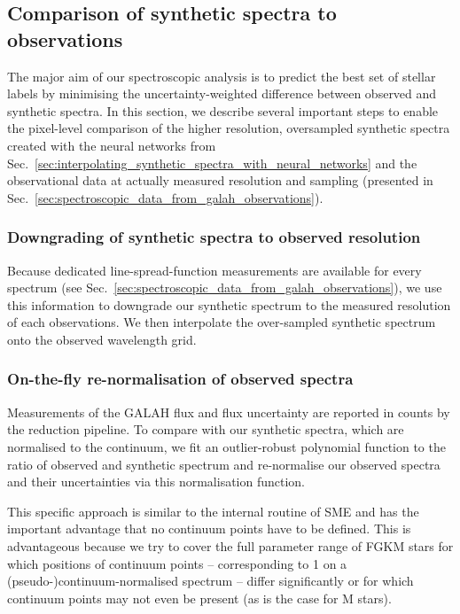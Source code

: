 \documentclass[
  journal=pasa,
  manuscript=research-paper, %
  year=2024,
  volume=37
]{cup-journal}
\begin{document}
\subsection{Comparison of synthetic spectra to observations}
\label{sec:comparison_synthetic_spectra_to_observations}

The major aim of our spectroscopic analysis is to predict the best set of stellar labels by minimising the uncertainty-weighted difference between observed and synthetic spectra. In this section, we describe several important steps to enable the pixel-level comparison of the higher resolution, oversampled synthetic spectra created with the neural networks from Sec.~\ref{sec:interpolating_synthetic_spectra_with_neural_networks} and the observational data at actually measured resolution and sampling (presented in Sec.~\ref{sec:spectroscopic_data_from_galah_observations}).

\subsubsection{Downgrading of synthetic spectra to observed resolution}

Because dedicated line-spread-function measurements are available for every spectrum (see Sec.~\ref{sec:spectroscopic_data_from_galah_observations}), we use this information to downgrade our synthetic spectrum to the measured resolution of each observations. We then interpolate the over-sampled synthetic spectrum onto the observed wavelength grid.

\subsubsection{On-the-fly re-normalisation of observed spectra}

Measurements of the GALAH flux and flux uncertainty are reported in counts by the reduction pipeline. To compare with our synthetic spectra, which are normalised to the continuum, we fit an outlier-robust polynomial function to the ratio of observed and synthetic spectrum and re-normalise our observed spectra and their uncertainties via this normalisation function.

This specific approach is similar to the internal routine of \textsc{SME} \citep{Piskunov2017} and has the important advantage that no continuum points have to be defined. This is advantageous because we try to cover the full parameter range of FGKM stars for which positions of continuum points -- corresponding to 1 on a (pseudo-)continuum-normalised spectrum -- differ significantly or for which continuum points may not even be present (as is the case for M stars).
\end{document}
